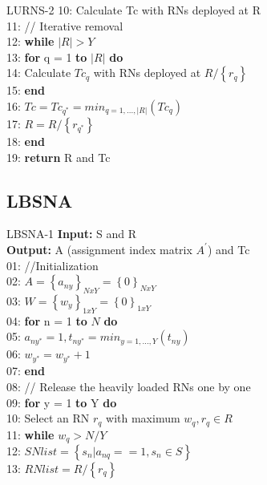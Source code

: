 \documentclass[main.tex]{subfiles}
\begin{document}
\begin{frame}{LURNS-2}
10: Calculate Tc with RNs deployed at R\\
11: // Iterative removal\\
12: \textbf{while} $|R|>Y$\\
13: \hspace{2mm}\textbf{for} q = 1 \textbf{to} $|R|$ \textbf{do}\\
14: \hspace{4mm}Calculate $Tc_q$ with RNs deployed at $R/\left\{r_q\right\}$\\
15: \hspace{2mm}\textbf{end}\\
16: \hspace{2mm}$Tc = Tc_{q^*} = min_{q=1,...,|R|}(Tc_q)$\\
17: \hspace{2mm}$R = R/\left\{r_{q^*}\right\}$\\
18: \textbf{end}\\
19: \textbf{return} R and Tc\\ 
\end{frame}

\subsection{LBSNA}
\begin{frame}{LBSNA-1}
\textbf{Input:} S and R\\
\textbf{Output:} A (assignment index matrix $A^{'}$) and Tc\\
01: //Initialization\\
02: $A = \left\{a_{ny}\right\}_{NxY} = \left\{0\right\}_{NxY}$\\
03: $W = \left\{w_{y}\right\}_{1xY} = \left\{0\right\}_{1xY}$\\
04: \textbf{for} n = 1 \textbf{to} $N$ \textbf{do}\\
05: \hspace{2mm}$a_{ny^*} = 1, t_{ny^*} = min_{y=1,...,Y}(t_{ny})$\\
06: \hspace{2mm}$w_{y^*} = w_{y^*} + 1$\\
07: \textbf{end}\\
08: // Release the heavily loaded RNs one by one\\
09: \textbf{for} y = 1 \textbf{to} Y \textbf{do}\\
10: \hspace{2mm}Select an RN $r_q$ with maximum $w_q, r_q \in R$\\
11: \hspace{2mm}\textbf{while} $w_q > N/Y$\\
12: \hspace{4mm}$SNlist = \left\{s_n | a_{nq} == 1, s_n \in S\right\}$\\
13: \hspace{4mm}$RNlist = R/\left\{r_q\right\}$\\
\end{frame}
\end{document}
